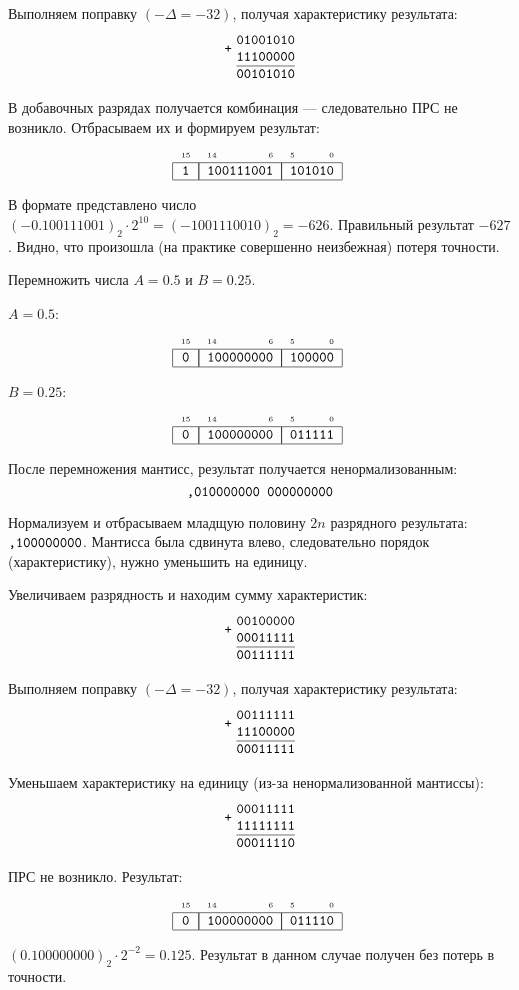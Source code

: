 \begin{Solve}
    Выполняем поправку $(-\Delta=-32)$, получая характеристику результата:
    \[
        \Addition{01001010}
                 {11100000}
                 {00101010}
    \]

    В добавочных разрядах получается комбинация  --- следовательно ПРС не возникло. Отбрасываем их и формируем результат:
    \[
        \FloatMyCharHex{1}{100111001}{101010}
    \]

    В формате представлено число $(-0.100111001)_2\cdot 2^{10} = (-1001110010)_2 = -626$. Правильный результат $-627$. Видно, что произошла (на практике совершенно неизбежная) потеря точности.
\end{Solve}

\begin{Example}
    Перемножить числа $A=0.5$ и $B=0.25$.
\end{Example}
\begin{Solve}

    $A=0.5$:
    \[
        \FloatMyCharHex{0}{100000000}{100000}
    \]
    
    $B=0.25$:
    \[
        \FloatMyCharHex{0}{100000000}{011111}
    \]
    
    После перемножения мантисс, результат получается ненормализованным: 
    \[
        \texttt{,010000000 000000000}
    \]
    
    Нормализуем и отбрасываем младщую половину $2n$ разрядного результата: $\texttt{,100000000}$. Мантисса была сдвинута влево, следовательно порядок (характеристику), нужно уменьшить на единицу.

    Увеличиваем разрядность и находим сумму характеристик:
    \[
        \Addition{00100000}
                 {00011111}
                 {00111111}
    \]
    
    Выполняем поправку $(-\Delta=-32)$, получая характеристику результата:
    \[
        \Addition{00111111}
                 {11100000}
                 {00011111}
    \]
    
    Уменьшаем характеристику на единицу (из-за ненормализованной мантиссы):
    \[
        \Addition{00011111}
                 {11111111}
                 {00011110}
    \]
    
    ПРС не возникло. Результат:
    \[
        \FloatMyCharHex{0}{100000000}{011110}
    \]
    
    $(0.100000000)_2\cdot 2^{-2} = 0.125$. Результат в данном случае получен без потерь в точности.
\end{Solve}

